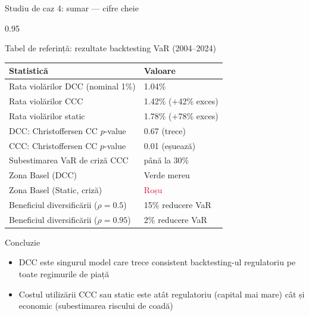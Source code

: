 \documentclass[9pt, aspectratio=169, t]{beamer}
\begin{document}
\begin{frame}{Studiu de caz 4: sumar --- cifre cheie}
    \begin{cminipage}{0.95\textwidth}
    {\footnotesize
    \begin{block}{Tabel de referință: rezultate backtesting VaR (2004--2024)}
        {\small
        \begin{center}
        \begin{tabular}{l|l}
            \hline
            \textbf{Statistică} & \textbf{Valoare} \\
            \hline
            Rata violărilor DCC (nominal 1\%) & 1.04\% \\
            Rata violărilor CCC              & 1.42\% ($+$42\% exces) \\
            Rata violărilor static           & 1.78\% ($+$78\% exces) \\
            DCC: Christoffersen CC $p$-value & 0.67 (trece) \\
            CCC: Christoffersen CC $p$-value & 0.01 (eșuează) \\
            Subestimarea VaR de criză CCC    & până la 30\% \\
            Zona Basel (DCC)                 & \textcolor{Forest}{Verde} mereu \\
            Zona Basel (Static, criză)       & \textcolor{Crimson}{Roșu} \\
            Beneficiul diversificării ($\rho = 0.5$) & 15\% reducere VaR \\
            Beneficiul diversificării ($\rho = 0.95$) & 2\% reducere VaR \\
            \hline
        \end{tabular}
        \end{center}
        }
    \end{block}
    \vspace{-2mm}
    \begin{alertblock}{Concluzie}
        \begin{itemize}\setlength{\itemsep}{0pt}
            \item DCC este singurul model care trece consistent backtesting-ul regulatoriu pe toate regimurile de piață
            \item Costul utilizării CCC sau static este atât regulatoriu (capital mai mare) cât și economic (subestimarea riscului de coadă)
        \end{itemize}
    \end{alertblock}
    }
    \end{cminipage}
\end{frame}
\end{document}
